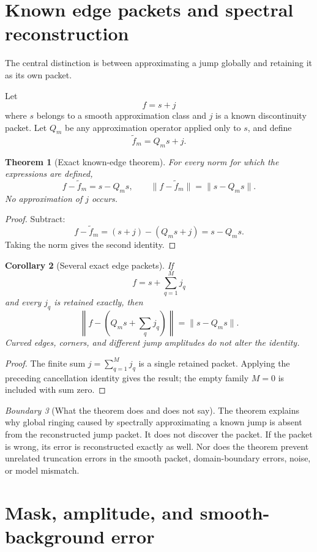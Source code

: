 \documentclass[11pt,a4paper]{article}
\newtheorem{theorem}{Theorem}[section]
\newtheorem{corollary}[theorem]{Corollary}
\theoremstyle{definition}
\theoremstyle{remark}
\newtheorem{boundary}[theorem]{Boundary}
\begin{document}
\section{Known edge packets and spectral reconstruction}\label{core:section:06}

The central distinction is between approximating a jump globally and retaining it as its own packet.

Let
\[
f=s+j
\]
where $s$ belongs to a smooth approximation class and $j$ is a known discontinuity packet. Let $Q_m$ be any approximation operator applied only to $s$, and define
\[
\widetilde f_m=Q_ms+j.
\]

\begin{theorem}[Exact known-edge theorem]\label{result:10}
For every norm for which the expressions are defined,
\[
\boxed{
f-\widetilde f_m=s-Q_ms,
\qquad
\|f-\widetilde f_m\|=\|s-Q_ms\|.
}
\]
No approximation of $j$ occurs.
\end{theorem}

\begin{proof}
Subtract:
\[
f-\widetilde f_m=(s+j)-(Q_ms+j)=s-Q_ms.
\]
Taking the norm gives the second identity.
\end{proof}

\begin{corollary}[Several exact edge packets]\label{result:11}
If
\[
f=s+\sum_{q=1}^{M}j_q
\]
and every $j_q$ is retained exactly, then
\[
\left\|f-\left(Q_ms+\sum_qj_q\right)\right\|
=\|s-Q_ms\|.
\]
Curved edges, corners, and different jump amplitudes do not alter the identity.
\end{corollary}
\begin{proof}
The finite sum $j=\sum_{q=1}^M j_q$ is a single retained packet. Applying the preceding cancellation identity gives the result; the empty family $M=0$ is included with sum zero.
\end{proof}

\begin{boundary}[What the theorem does and does not say]\label{core:record:15}
The theorem explains why global ringing caused by spectrally approximating a known jump is absent from the reconstructed jump packet. It does not discover the packet. If the packet is wrong, its error is reconstructed exactly as well. Nor does the theorem prevent unrelated truncation errors in the smooth packet, domain-boundary errors, noise, or model mismatch.
\end{boundary}

\section{Mask, amplitude, and smooth-background error}\label{core:section:07}
\end{document}
